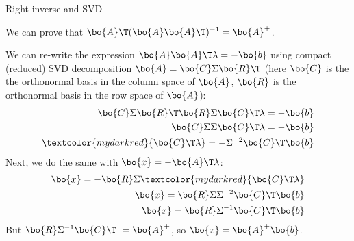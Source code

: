 \documentclass{beamer}
\begin{document}
\begin{frame}{Right inverse and SVD}
	\begin{flushleft}
		
		We can prove that $ \bo{A}\T  (\bo{A} \bo{A}\T )^{-1} = \bo{A}^+$.
		
		\bigskip
		
		We can re-write the expression $\bo{A} \bo{A}\T  \lambda= -\bo{b}$ using compact (reduced) SVD decomposition $\bo{A} = \bo{C}\Sigma\bo{R}\T$ (here $\bo{C}$ is the the orthonormal basis in the column space of $\bo{A}$, $\bo{R}$ is the orthonormal basis in the row space of $\bo{A}$):
		\begin{align}
			\bo{C}\Sigma\bo{R}\T \bo{R}\Sigma\bo{C}\T  \lambda= -\bo{b}
			\\
			\bo{C}\Sigma \Sigma\bo{C}\T  \lambda= -\bo{b}
			\\
			\textcolor{mydarkred}{\bo{C}\T  \lambda}= -\Sigma^{-2} \bo{C}\T \bo{b}
		\end{align}				
		Next, we do the same with $\bo{x} = -\bo{A}\T  \lambda$:
		\begin{align}
			\bo{x} = -\bo{R}\Sigma\textcolor{mydarkred}{\bo{C}\T  \lambda}
			\\
			\bo{x} = \bo{R}\Sigma\Sigma^{-2} \bo{C}\T \bo{b}
			\\
			\bo{x} = \bo{R}\Sigma^{-1} \bo{C}\T \bo{b}
		\end{align}				
		But $ \bo{R}\Sigma^{-1} \bo{C}\T \ = \bo{A}^+$, so $\bo{x} =\bo{A}^+ \bo{b}$. 
		
	\end{flushleft}
\end{frame}
\end{document}
